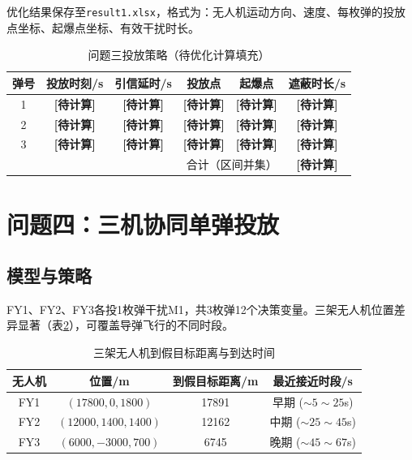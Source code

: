 \documentclass[a4paper]{ctexart}
\begin{document}
优化结果保存至\texttt{result1.xlsx}，格式为：无人机运动方向、速度、每枚弹的投放点坐标、起爆点坐标、有效干扰时长。

\begin{table}[H]
\centering
{}
\caption{问题三投放策略（待优化计算填充）}
\label{tab:q3_result}
\begin{tabular}{c|c|c|c|c|c}
\toprule
弹号 & 投放时刻/s & 引信延时/s & 投放点 & 起爆点 & 遮蔽时长/s \\
\midrule
1 & \textbf{[待计算]} & \textbf{[待计算]} & \textbf{[待计算]} & \textbf{[待计算]} & \textbf{[待计算]} \\
2 & \textbf{[待计算]} & \textbf{[待计算]} & \textbf{[待计算]} & \textbf{[待计算]} & \textbf{[待计算]} \\
3 & \textbf{[待计算]} & \textbf{[待计算]} & \textbf{[待计算]} & \textbf{[待计算]} & \textbf{[待计算]} \\
\midrule
\multicolumn{5}{r|}{合计（区间并集）} & \textbf{[待计算]} \\
\bottomrule
\end{tabular}
\end{table}

\section{问题四：三机协同单弹投放}

\subsection{模型与策略}

FY1、FY2、FY3各投1枚弹干扰M1，共3枚弹12个决策变量。三架无人机位置差异显著（表\ref{tab:uav_dist}），可覆盖导弹飞行的不同时段。

\begin{table}[H]
\centering
{}
\caption{三架无人机到假目标距离与到达时间}
\label{tab:uav_dist}
\begin{tabular}{c|c|c|c}
\toprule
无人机 & 位置/m & 到假目标距离/m & 最近接近时段/s \\
\midrule
FY1 & $(17800, 0, 1800)$ & 17891 & 早期 ($\sim 5\sim 25$s) \\
FY2 & $(12000, 1400, 1400)$ & 12162 & 中期 ($\sim 25\sim 45$s) \\
FY3 & $(6000, -3000, 700)$ & 6745 & 晚期 ($\sim 45\sim 67$s) \\
\bottomrule
\end{tabular}
\end{table}
\end{document}
